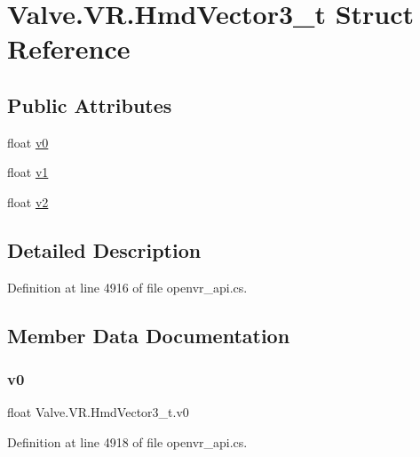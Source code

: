\hypertarget{struct_valve_1_1_v_r_1_1_hmd_vector3__t}{}\section{Valve.\+V\+R.\+Hmd\+Vector3\+\_\+t Struct Reference}
\label{struct_valve_1_1_v_r_1_1_hmd_vector3__t}
\subsection*{Public Attributes}
\begin{DoxyCompactItemize}
\item 
float \mbox{\hyperlink{struct_valve_1_1_v_r_1_1_hmd_vector3__t_a921d26e7103ed61a005446c25b930cdd}{v0}}
\item 
float \mbox{\hyperlink{struct_valve_1_1_v_r_1_1_hmd_vector3__t_a0fc424c0b655804fde0403c376e24516}{v1}}
\item 
float \mbox{\hyperlink{struct_valve_1_1_v_r_1_1_hmd_vector3__t_aa98038d0aba070da444bc3a08afa99db}{v2}}
\end{DoxyCompactItemize}


\subsection{Detailed Description}


Definition at line 4916 of file openvr\+\_\+api.\+cs.



\subsection{Member Data Documentation}
\mbox{\label{struct_valve_1_1_v_r_1_1_hmd_vector3__t_a921d26e7103ed61a005446c25b930cdd}} 
\subsubsection{\texorpdfstring{v0}{v0}}
{\footnotesize\ttfamily float Valve.\+V\+R.\+Hmd\+Vector3\+\_\+t.\+v0}



Definition at line 4918 of file openvr\+\_\+api.\+cs.

\mbox{\label{struct_valve_1_1_v_r_1_1_hmd_vector3__t_a0fc424c0b655804fde0403c376e24516}} 
